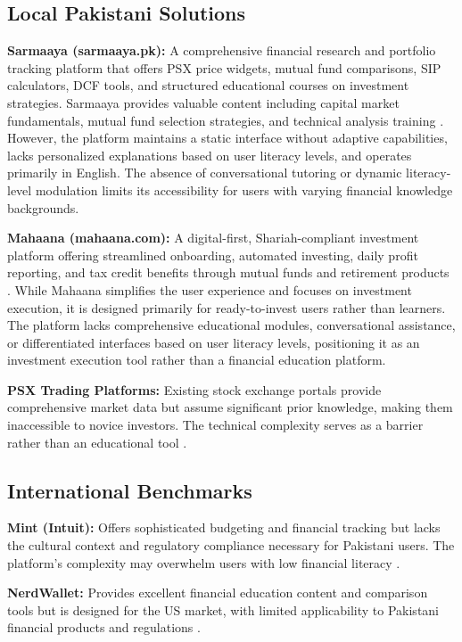 \documentclass[conference]{IEEEtran}
\begin{document}
\subsection{Local Pakistani Solutions}

\textbf{Sarmaaya (sarmaaya.pk):} A comprehensive financial research and portfolio tracking platform that offers PSX price widgets, mutual fund comparisons, SIP calculators, DCF tools, and structured educational courses on investment strategies. Sarmaaya provides valuable content including capital market fundamentals, mutual fund selection strategies, and technical analysis training \cite{sarmaaya2023}. However, the platform maintains a static interface without adaptive capabilities, lacks personalized explanations based on user literacy levels, and operates primarily in English. The absence of conversational tutoring or dynamic literacy-level modulation limits its accessibility for users with varying financial knowledge backgrounds.

\textbf{Mahaana (mahaana.com):} A digital-first, Shariah-compliant investment platform offering streamlined onboarding, automated investing, daily profit reporting, and tax credit benefits through mutual funds and retirement products \cite{mahaana2023}. While Mahaana simplifies the user experience and focuses on investment execution, it is designed primarily for ready-to-invest users rather than learners. The platform lacks comprehensive educational modules, conversational assistance, or differentiated interfaces based on user literacy levels, positioning it as an investment execution tool rather than a financial education platform.

\textbf{PSX Trading Platforms:} Existing stock exchange portals provide comprehensive market data but assume significant prior knowledge, making them inaccessible to novice investors. The technical complexity serves as a barrier rather than an educational tool \cite{psx2023}.

\subsection{International Benchmarks}

\textbf{Mint (Intuit):} Offers sophisticated budgeting and financial tracking but lacks the cultural context and regulatory compliance necessary for Pakistani users. The platform's complexity may overwhelm users with low financial literacy \cite{mint2023}.

\textbf{NerdWallet:} Provides excellent financial education content and comparison tools but is designed for the US market, with limited applicability to Pakistani financial products and regulations \cite{nerdwallet2023}.
\end{document}
